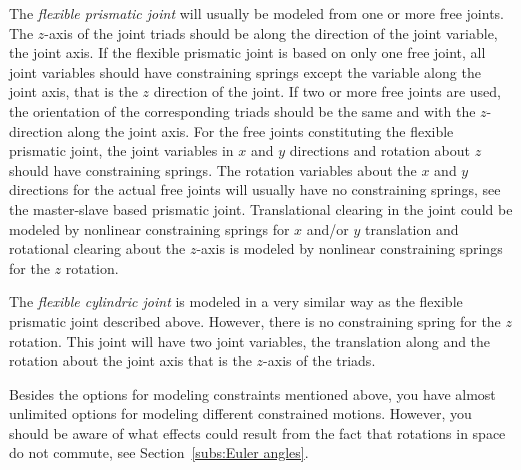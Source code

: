 The {\it flexible prismatic joint} will usually be modeled from one or more
free joints.
The $z$-axis of the joint triads should be along the direction of the joint
variable, the joint axis.
If the flexible prismatic joint is based on only one free joint, all joint
variables should have constraining springs except the variable along the joint
axis, that is the $z$ direction of the joint.
If two or more free joints are used, the orientation of the corresponding triads
should be the same and with the $z$-direction along the joint axis.
For the free joints constituting the flexible prismatic joint, the joint
variables in $x$ and $y$ directions and rotation about $z$ should have
constraining springs.
The rotation variables about the $x$ and $y$ directions for the actual free
joints will usually have no constraining springs, see the master-slave based
prismatic joint.
Translational clearing in the joint could be modeled by nonlinear constraining
springs for $x$ and/or $y$ translation and rotational clearing about the
$z$-axis is modeled by nonlinear constraining springs for the $z$ rotation.

The {\it flexible cylindric joint} is modeled in a very similar way as the
flexible prismatic joint described above.
However, there is no constraining spring for the $z$ rotation.
This joint will have two joint variables, the translation along and the rotation
about the joint axis that is the $z$-axis of the triads.

Besides the options for modeling constraints mentioned above, you have almost
unlimited options for modeling different constrained motions.
However, you should be aware of what effects could result from the fact that
rotations in space do not commute, see Section~\ref{subs:Euler angles}.
